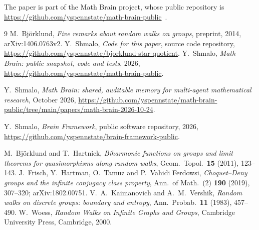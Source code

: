 \documentclass[11pt]{amsart}
\theoremstyle{definition}
\theoremstyle{remark}
\begin{document}
The paper is part of the Math Brain project, whose public repository is \url{https://github.com/yspennstate/math-brain-public}~\cite{MathBrainRepo}.

\begin{thebibliography}{9}
 M.~Bj\"orklund, \emph{Five remarks about random walks on groups}, preprint, 2014, arXiv:1406.0763v2.
 Y.~Shmalo, \emph{Code for this paper}, source code repository, \url{https://github.com/yspennstate/bjorklund-star-quotient}.
 Y.~Shmalo, \emph{Math Brain: public snapshot, code and tests}, 2026, \url{https://github.com/yspennstate/math-brain-public}.

 Y.~Shmalo, \emph{Math Brain: shared, auditable memory for multi-agent mathematical research}, October 2026, \url{https://github.com/yspennstate/math-brain-public/tree/main/papers/math-brain-2026-10-24}.

 Y.~Shmalo, \emph{Brain Framework}, public software repository, 2026, \url{https://github.com/yspennstate/brain-framework-public}.

 M.~Bj\"orklund and T.~Hartnick, \emph{Biharmonic functions on groups and limit theorems for quasimorphisms along random walks}, Geom.\ Topol.\ \textbf{15} (2011), 123--143.
 J.~Frisch, Y.~Hartman, O.~Tamuz and P.~Vahidi Ferdowsi, \emph{Choquet--Deny groups and the infinite conjugacy class property}, Ann.\ of Math.\ (2) \textbf{190} (2019), 307--320; arXiv:1802.00751.
 V.~A.~Kaimanovich and A.~M.~Vershik, \emph{Random walks on discrete groups: boundary and entropy}, Ann.\ Probab.\ \textbf{11} (1983), 457--490.
 W.~Woess, \emph{Random Walks on Infinite Graphs and Groups}, Cambridge University Press, Cambridge, 2000.
\end{thebibliography}
\end{document}

